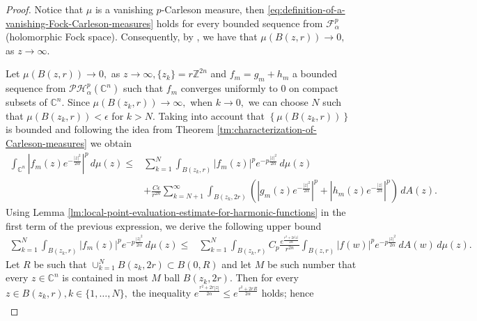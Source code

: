 \documentclass[10pt,leqno]{amsart}
\theoremstyle{remark}
\numberwithin{equation}{section}
\newcommand{\ph}{\mathcal{PH}_\alpha^p(\mathbb{C}^n)}%
\begin{document}
\begin{proof}
	Notice that $\mu$ is a vanishing $p$-Carleson measure, then \eqref{eq:definition-of-a-vanishing-Fock-Carleson-measures} holds for every bounded sequence from $\mathcal{F}_\alpha^{p}$ (holomorphic Fock space). Consequently, by \cite[Thm 3.30]{KeheZhuAnalysisOnFockSpaces}, we have that $\mu(B(z,r)) \to 0,$ as $z \to \infty.$

	Let $\mu(B(z,r))\to 0,$ as $z \to \infty, \{z_k\}=r\mathbb{Z}^{2n}$ and $f_m=g_m +h_m$ a bounded sequence from $\ph$ such that $f_m$ converges uniformly to 0 on compact subsets of $\mathbb{C}^{n}.$
	Since $\mu(B(z_k,r))\to \infty,$ when $k \to 0,$ we can choose $N$ such that $\mu(B(z_k,r))<\epsilon$ for $k > N.$ Taking into account that $\left\{ \mu(B(z_k,r)) \right\} $ is bounded and following the idea from Theorem \ref{tm:characterization-of-Carleson-measures} we obtain
	\begin{equation}\label{eq:vanishing-fock-carleson-measures-inequality-in-proof}
		\begin{split}
			\int_{\mathbb{C}^{n}}^{}\left| f_m(z)e^{-\frac{|z|^2}{2\alpha}} \right| ^{p}\, d\mu(z)
			\leq & \sum_{k=1}^{N}  \int_{B(z_k,r)}^{}|f_m(z)|^p e^{-p\frac{|z|^2}{2\alpha}}\, d\mu(z)                                                                                                                      \\
			     & + \frac{C \epsilon}{r^{2n}} \sum_{k=N+1}^{\infty} \int_{B(z_k,2r)}^{}\left( \left| g_m(z) e^{-\frac{|z|^2}{2\alpha}} \right| ^{p}+\left| h_m(z) e^{-\frac{|z|}{2\alpha}} \right| ^{p} \right) \, dA(z).
		\end{split}
	\end{equation}
	Using  Lemma \ref{lm:local-point-evaluation-estimate-for-harmonic-functions} in the first term of the previous expression, we derive the following upper bound
	\begin{align*}
		\sum_{k=1}^{N}  \int_{B(z_k,r)}^{}|f_m(z)|^p e^{-p\frac{|z|^2}{2\alpha}}\, d\mu(z) \leq & \sum_{k=1}^{N} \int_{B(z_k,r)}^{}C_p \frac{e^{\frac{r^2+2r|z|}{2\alpha}}}{r^{2n}} \int_{B(z,r)}^{}|f(w)|^p e^{-p \frac{|z|^2}{2\alpha}}\, dA(w) \, d\mu(z).
	\end{align*}
	Let $R$ be such that $\cup_{k=1}^N B(z_k,2r) \subset B(0,R)$ and let $M$ be such number that every $z \in \mathbb{C}^{n}$ is contained in most $M$ ball $B(z_k,2r).$  Then for every $z \in B(z_k,r), k \in \{1,\dots ,N\},$ the inequality $e^{\frac{r^2+2r|z|}{2\alpha}}\leq e^{\frac{r^2+2rR}{2\alpha}}$ holds; hence
	\begin{align*}

\end{align*}
\end{proof}
\end{document}
